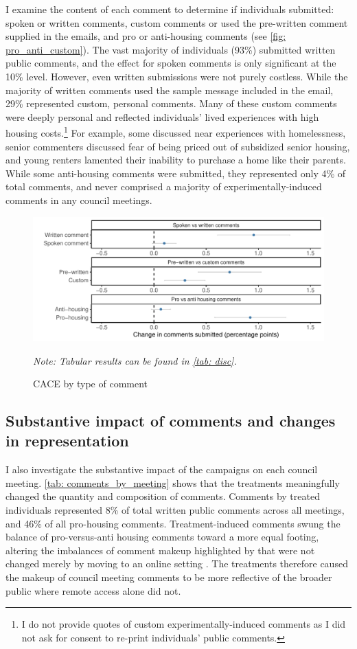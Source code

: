 \documentclass[12pt,final,fleqn]{article}
\theoremstyle{plain}
\begin{document}
I examine the content of each comment to determine if individuals submitted: spoken or written comments, custom comments or used the pre-written comment supplied in the emails, and pro or anti-housing comments (see \autoref{fig: pro_anti_custom}). The vast majority of individuals (93\%) submitted written public comments, and the effect for spoken comments is only significant at the 10\% level. However, even written submissions were not purely costless. While the majority of written comments used the sample message included in the email, 29\% represented custom, personal comments. Many of these custom comments were deeply personal and reflected individuals' lived experiences with high housing costs.\footnote{I do not provide quotes of custom experimentally-induced comments as I did not ask for consent to re-print individuals' public comments.} For example, some discussed near experiences with homelessness, senior commenters discussed fear of being priced out of subsidized senior housing, and young renters lamented their inability to purchase a home like their parents. While some anti-housing comments were submitted, they represented only 4\% of total comments, and never comprised a majority of experimentally-induced comments in any council meetings.

\begin{figure}[H]
\includegraphics[width = \textwidth]{../figs/fg5.pdf}
\caption{CACE by type of comment}
\vspace{-0.5cm}
{\small \textit{Note: Tabular results can be found in \autoref{tab: disc}.}}
\label{fig: pro_anti_custom}
\end{figure}


\subsection{Substantive impact of comments and changes in representation}

I also investigate the substantive impact of the campaigns on each council meeting. \autoref{tab: comments_by_meeting} shows that the treatments meaningfully changed the quantity and composition of comments. Comments by treated individuals represented 8\% of total written public comments across all meetings, and 46\% of all pro-housing comments. Treatment-induced comments swung the balance of pro-versus-anti housing comments toward a more equal footing, altering the imbalances of comment makeup highlighted by \citet{yoder2020does} that were not changed merely by moving to an online setting \citep{einstein2021zoom}. The treatments therefore caused the makeup of council meeting comments to be more reflective of the broader public where remote access alone did not.
\end{document}
